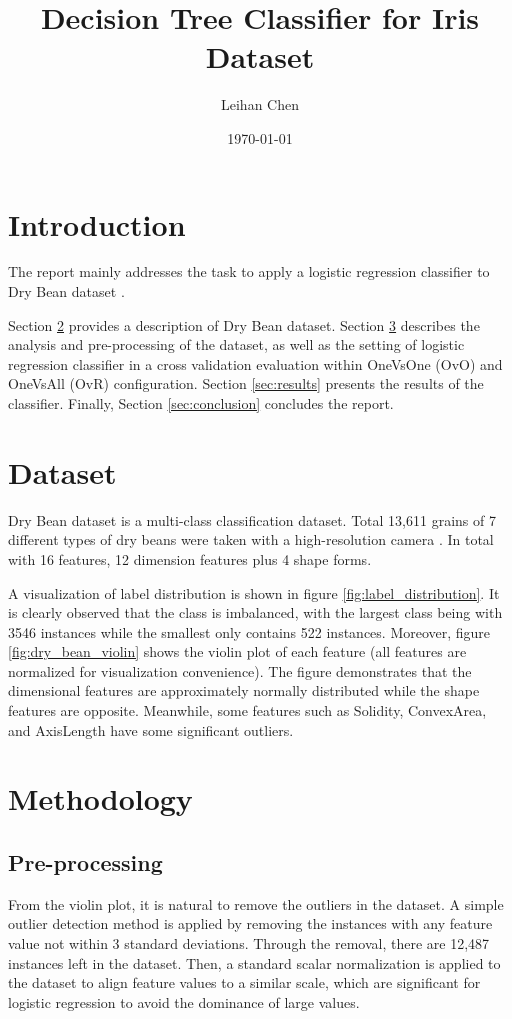 \documentclass[12pt,a4paper]{article}
\title{Decision Tree Classifier for Iris Dataset}
\author{Leihan Chen}
\date{\today}
\begin{document}

\section{Introduction}
The report mainly addresses the task to apply a logistic regression classifier \cite{scikit-learn_LogisticRegression} to Dry Bean dataset \cite{dry_bean_602}. 

Section \ref{sec:dataset} provides a description of Dry Bean dataset. 
Section \ref{sec:methodology} describes the analysis and pre-processing of the dataset, 
as well as the setting of logistic regression classifier in a cross validation evaluation within OneVsOne (OvO) and OneVsAll (OvR) configuration. 
Section \ref{sec:results} presents the results of the classifier. Finally, Section \ref{sec:conclusion} concludes the report. 


\section{Dataset}\label{sec:dataset}
Dry Bean dataset is a multi-class classification dataset. Total 13,611 grains of 7 different types of dry beans were taken with a high-resolution camera \cite{dry_bean_602}. In total with 16 features, 12 dimension features plus 4 shape forms. 

A visualization of label distribution is shown in figure \ref{fig:label_distribution}. It is clearly observed that the class is imbalanced, with the largest class being with 3546 instances while the smallest only contains 522 instances.
Moreover, figure \ref{fig:dry_bean_violin} shows the violin plot of each feature (all features are normalized for visualization convenience). 
The figure demonstrates that the dimensional features are approximately normally distributed while the shape features are opposite. Meanwhile, some features such as Solidity, ConvexArea, and AxisLength have some significant outliers.

\section{Methodology}\label{sec:methodology}
\subsection{Pre-processing}\label{subsec:preprocessing}
From the violin plot, it is natural to remove the outliers in the dataset. A simple outlier detection method is applied by removing the instances with any feature value not within 3 standard deviations.
Through the removal, there are 12,487 instances left in the dataset. Then, a standard scalar normalization is applied to the dataset to align feature values to a similar scale, which are significant for logistic regression to avoid the dominance of large values.
\end{document}
